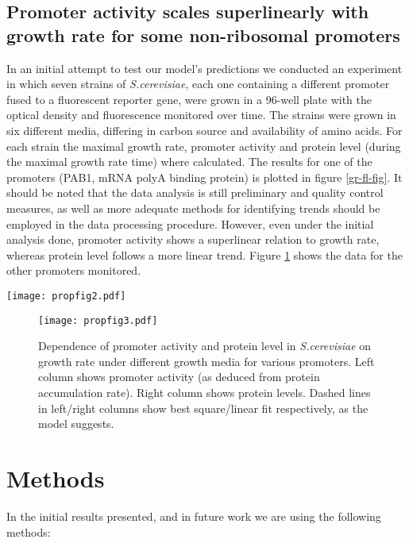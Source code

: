 \documentclass[a4page,notitlepage]{article}
\begin{document}
\subsection{Promoter activity scales superlinearly with growth rate for some non-ribosomal promoters}
\label{methods}
In an initial attempt to test our model's predictions we conducted an experiment in which seven strains of \emph{S.cerevisiae}, each one containing a different promoter fused to a fluorescent reporter gene, were grown in a 96-well plate with the optical density and fluorescence monitored over time.
The strains were grown in six different media, differing in carbon source and availability of amino acids.
For each strain the maximal growth rate, promoter activity and protein level (during the maximal growth rate time) where calculated.
The results for one of the promoters (PAB1, mRNA polyA binding protein) is plotted in figure \ref{gr-fl-fig}.
It should be noted that the data analysis is still preliminary and quality control measures, as well as more adequate methods for identifying trends should be employed in the data processing procedure.
However, even under the initial analysis done, promoter activity shows a superlinear relation to growth rate, whereas protein level follows a more linear trend.
Figure \ref{gr-fl-mult} shows the data for the other promoters monitored.
\begin{SCfigure}
\caption{Dependence of promoter activity and protein level on growth rate for PAB1 (Poly(A) binding protein) promoter under different growth media.
(A) Protein level scales roughly like growth rate.
Dashed line shows best linear fit, as the model suggests.
(B) Promoter activity (as deduced by protein accumulation rate) exhibits a superlinear relation to growth rate.
Dashed line shows best square fit, as the model suggests.
}
\texttt{[image: propfig2.pdf]}
\label{gr-fl-fig}
\end{SCfigure}
\begin{figure}[h]
\texttt{[image: propfig3.pdf]}
\caption{Dependence of promoter activity and protein level in \emph{S.cerevisiae} on growth rate under different growth media for various promoters.
Left column shows promoter activity (as deduced from protein accumulation rate).
Right column shows protein levels.
Dashed lines in left/right columns show best square/linear fit respectively, as the model suggests.
}
\label{gr-fl-mult}
\end{figure}
\section{Methods}
In the initial results presented, and in future work we are using the following methods:
\end{document}
